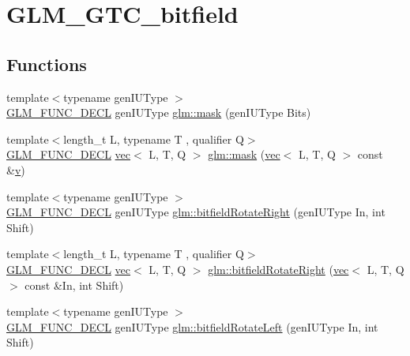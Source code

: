 \hypertarget{group__gtc__bitfield}{}\section{G\+L\+M\+\_\+\+G\+T\+C\+\_\+bitfield}
\label{group__gtc__bitfield}
\subsection*{Functions}
\begin{DoxyCompactItemize}
\item 
{\footnotesize template$<$typename gen\+I\+U\+Type $>$ }\\\hyperlink{setup_8hpp_ab2d052de21a70539923e9bcbf6e83a51}{G\+L\+M\+\_\+\+F\+U\+N\+C\+\_\+\+D\+E\+CL} gen\+I\+U\+Type \hyperlink{group__gtc__bitfield_gad7eba518a0b71662114571ee76939f8a}{glm\+::mask} (gen\+I\+U\+Type Bits)
\item 
{\footnotesize template$<$length\+\_\+t L, typename T , qualifier Q$>$ }\\\hyperlink{setup_8hpp_ab2d052de21a70539923e9bcbf6e83a51}{G\+L\+M\+\_\+\+F\+U\+N\+C\+\_\+\+D\+E\+CL} \hyperlink{structglm_1_1vec}{vec}$<$ L, T, Q $>$ \hyperlink{group__gtc__bitfield_ga2e64e3b922a296033b825311e7f5fff1}{glm\+::mask} (\hyperlink{structglm_1_1vec}{vec}$<$ L, T, Q $>$ const \&\hyperlink{_s_d_l__opengl_8h_a10a82eabcb59d2fcd74acee063775f90}{v})
\item 
{\footnotesize template$<$typename gen\+I\+U\+Type $>$ }\\\hyperlink{setup_8hpp_ab2d052de21a70539923e9bcbf6e83a51}{G\+L\+M\+\_\+\+F\+U\+N\+C\+\_\+\+D\+E\+CL} gen\+I\+U\+Type \hyperlink{group__gtc__bitfield_ga1c33d075c5fb8bd8dbfd5092bfc851ca}{glm\+::bitfield\+Rotate\+Right} (gen\+I\+U\+Type In, int Shift)
\item 
{\footnotesize template$<$length\+\_\+t L, typename T , qualifier Q$>$ }\\\hyperlink{setup_8hpp_ab2d052de21a70539923e9bcbf6e83a51}{G\+L\+M\+\_\+\+F\+U\+N\+C\+\_\+\+D\+E\+CL} \hyperlink{structglm_1_1vec}{vec}$<$ L, T, Q $>$ \hyperlink{group__gtc__bitfield_ga590488e1fc00a6cfe5d3bcaf93fbfe88}{glm\+::bitfield\+Rotate\+Right} (\hyperlink{structglm_1_1vec}{vec}$<$ L, T, Q $>$ const \&In, int Shift)
\item 
{\footnotesize template$<$typename gen\+I\+U\+Type $>$ }\\\hyperlink{setup_8hpp_ab2d052de21a70539923e9bcbf6e83a51}{G\+L\+M\+\_\+\+F\+U\+N\+C\+\_\+\+D\+E\+CL} gen\+I\+U\+Type \hyperlink{group__gtc__bitfield_ga2eb49678a344ce1495bdb5586d9896b9}{glm\+::bitfield\+Rotate\+Left} (gen\+I\+U\+Type In, int Shift)

\end{DoxyCompactItemize}
